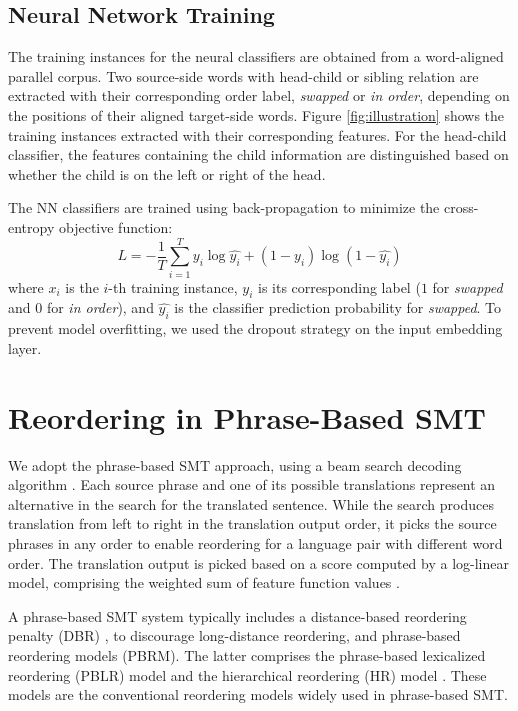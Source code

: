 \documentclass[letterpaper]{article}
\begin{document}
\subsection{Neural Network Training}

The training instances for the neural classifiers are obtained from a word-aligned parallel corpus. Two source-side words with head-child or sibling relation are extracted with their corresponding order label, \textit{swapped} or \textit{in order}, depending on the positions of their aligned target-side words. Figure \ref{fig:illustration} shows the training instances extracted with their corresponding features. For the head-child classifier, the features containing the child information are distinguished based on whether the child is on the left or right of the head.

The NN classifiers are trained using back-propagation to minimize the cross-entropy objective function:
\begin{equation}
L=-\frac{1}{T}\sum_{i=1}^{T} y_i \log\hat{y_i} + (1-y_i) \log(1-\hat{y_i})
\end{equation}
where $x_i$ is the $i$-th training instance, $y_i$ is its corresponding label ($1$ for \textit{swapped} and $0$ for \textit{in order}), and $\hat{y_i}$ is the classifier prediction probability for \textit{swapped}. To prevent model overfitting, we used the dropout strategy \cite{srivastava_dropout:_2014} on the input embedding layer.

\section{Reordering in Phrase-Based SMT}

We adopt the phrase-based SMT approach, using a beam search decoding algorithm \cite{koehn_pharaoh:_2004}. Each source phrase and one of its possible translations represent an alternative in the search for the translated sentence. While the search produces translation from left to right in the translation output order, it picks the source phrases in any order to enable reordering for a language pair with different word order. The translation output is picked based on a score computed by a log-linear model, comprising the weighted sum of feature function values \cite{och_discriminative_2002}.

A phrase-based SMT system typically includes a distance-based reordering penalty (DBR) \cite{koehn_statistical_2003}, to discourage long-distance reordering, and phrase-based reordering models (PBRM). The latter comprises the phrase-based lexicalized reordering (PBLR) model \cite{tillmann_unigram_2004,koehn_edinburgh_2005} and the hierarchical reordering (HR) model \cite{galley_simple_2008}. These models are the conventional reordering models widely used in phrase-based SMT.
\end{document}
